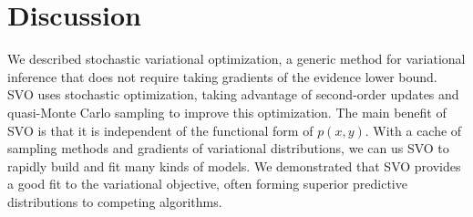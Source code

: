 
\section{Discussion}

We described stochastic variational optimization, a generic method for
variational inference that does not require taking gradients of the
evidence lower bound.  SVO uses stochastic optimization, taking
advantage of second-order updates and quasi-Monte Carlo sampling to
improve this optimization.  The main benefit of SVO is that it is
independent of the functional form of $p(x, y)$.  With a cache of
sampling methods and gradients of variational distributions, we can us
SVO to rapidly build and fit many kinds of models.  We demonstrated
that SVO provides a good fit to the variational objective, often
forming superior predictive distributions to competing algorithms.







